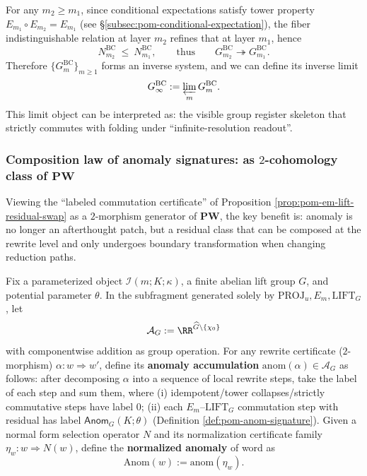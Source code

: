 \begin{corollary}\label{cor:pom-bc-inverse-system}
For any \(m_2\ge m_1\), since conditional expectations satisfy tower property \(E_{m_1}\circ E_{m_2}=E_{m_1}\) (see \S\ref{subsec:pom-conditional-expectation}), the fiber indistinguishable relation at layer \(m_2\) refines that at layer \(m_1\), hence
\[
N^{\mathrm{BC}}_{m_2}\ \le\ N^{\mathrm{BC}}_{m_1},
\qquad\text{thus}\qquad
G^{\mathrm{BC}}_{m_2}\twoheadrightarrow G^{\mathrm{BC}}_{m_1}.
\]
Therefore \(\{G^{\mathrm{BC}}_m\}_{m\ge 1}\) forms an inverse system, and we can define its inverse limit
\[
G^{\mathrm{BC}}_\infty:=\varprojlim_m G^{\mathrm{BC}}_m.
\]
This limit object can be interpreted as: the visible group register skeleton that strictly commutes with folding under ``infinite-resolution readout''.
\end{corollary}

\subsubsection{Composition law of anomaly signatures: as \texorpdfstring{$2$}{2}-cohomology class of \texorpdfstring{$\mathbf{PW}$}{PW}}\label{subsec:pom-anom-cohomology}
Viewing the ``labeled commutation certificate'' of Proposition \ref{prop:pom-em-lift-residual-swap} as a \(2\)-morphism generator of \(\mathbf{PW}\), the key benefit is: anomaly is no longer an afterthought patch, but a residual class that can be composed at the rewrite level and only undergoes boundary transformation when changing reduction paths.

\begin{definition}\label{def:pom-anom-accumulation}
Fix a parameterized object \(\mathcal{I}(m;K;\kappa)\), a finite abelian lift group \(G\), and potential parameter \(\theta\).
In the subfragment generated solely by \(\mathrm{PROJ}_u,E_m,\mathrm{LIFT}_G\), let
\[
\mathcal{A}_G:=\RR^{\widehat G\setminus\{\chi_0\}}
\]
with componentwise addition as group operation.
For any rewrite certificate (\(2\)-morphism) \(\alpha:w\Rightarrow w'\), define its \textbf{anomaly accumulation}
\(\mathrm{anom}(\alpha)\in\mathcal{A}_G\)
as follows: after decomposing \(\alpha\) into a sequence of local rewrite steps, take the label of each step and sum them, where
(i) idempotent/tower collapses/strictly commutative steps have label \(0\);
(ii) each \(E_m\)--\(\mathrm{LIFT}_G\) commutation step with residual has label \(\mathsf{Anom}_G(K;\theta)\) (Definition \ref{def:pom-anom-signature}).
Given a normal form selection operator \(N\) and its normalization certificate family \(\eta_w:w\Rightarrow N(w)\), define the \textbf{normalized anomaly} of word as
\[
\mathrm{Anom}(w):=\mathrm{anom}(\eta_w).
\]
\end{definition}


